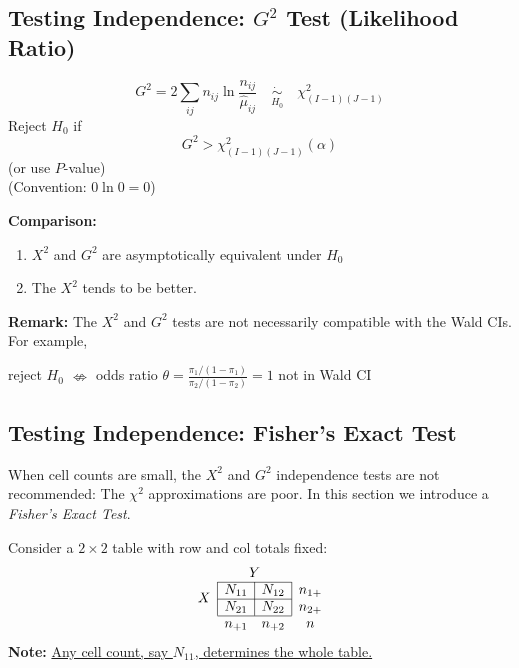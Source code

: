 \documentclass[11pt]{elegantbook}
\begin{document}
\subsection{Testing Independence: $G^2$ Test (Likelihood Ratio)}
\begin{definition}
    \normalfont
    $$G^2=2\sum_{i j}n_{ij} \ln \frac{n_{i j}}{\hat{\mu}_{i j}} \quad \underset{H_0}{\dot{\sim}}\quad \chi_{(I-1)(J-1)}^2$$
    Reject $H_0$ if
    $$G^2>\chi_{(I-1)(J-1)}^2(\alpha)$$
    (or use $P$-value)\\
    (Convention: $0 \ln 0 = 0$)
\end{definition}
\textbf{Comparison:}
\begin{enumerate}
    \item $X^2$ and $G^2$ are asymptotically equivalent under $H_0$
    \item The $X^2$ tends to be better.
\end{enumerate}
\textbf{Remark:} The $X^2$ and $G^2$ tests are not necessarily compatible with the Wald CIs. For example,
\begin{center}
    reject $H_0$ $\nLeftrightarrow$  odds ratio $\theta =\frac{\pi_1/(1-\pi_1)}{\pi_2/(1-\pi_2)}= 1$ not in Wald CI
\end{center}

\subsection{Testing Independence: Fisher's Exact Test}
When cell counts are small, the $X^2$ and $G^2$ independence tests are not recommended: The $\chi^2$ approximations are poor. In this section we introduce a \textit{Fisher's Exact Test}.

Consider a $2 \times 2$ table with row and col totals fixed:
$$
\begin{array}{c|c|c|c}
\multicolumn{1}{r}{} &\multicolumn{2}{c}{Y} \\
\cline { 2 - 3 }
\multicolumn{1}{r|}{\multirow{2}{*}{$X$}} & N_{11} & N_{12} & n_{1+} \\
\cline { 2 - 3 } 
\multicolumn{1}{r|}{} & N_{21} & N_{22} & n_{2+} \\
\cline { 2 - 3 } \multicolumn{1}{c}{}&\multicolumn{1}{c}{n_{+1}}&\multicolumn{1}{c}{n_{+2}}&\multicolumn{1}{c}{n}
\end{array}
$$
\textbf{Note:} \underline{Any cell count, say $N_{11}$, determines the whole table.}
\end{document}

